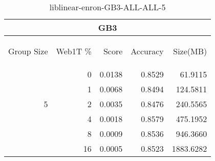 \begin{center}
\begin{table}[htbp]
\begin{tabular}{ | r | r | r | r | r |}
\hline
\multicolumn{5}{|c|}{GB3}\\
\hline
\begin{sideways}Group Size\end{sideways} & \begin{sideways}Web1T \%\end{sideways} & \begin{sideways}Score\end{sideways} & \begin{sideways}Accuracy\end{sideways} & \begin{sideways}Size(MB)\end{sideways}\\
\hline
\multirow{5}{*}{5}
 & 0 & 0.0138 & 0.8529 & 61.9115\\ \cline{2-5}
 & 1 & 0.0068 & 0.8494 & 124.5811\\ \cline{2-5}
 & 2 & 0.0035 & 0.8476 & 240.5565\\ \cline{2-5}
 & 4 & 0.0018 & 0.8579 & 475.1952\\ \cline{2-5}
 & 8 & 0.0009 & 0.8536 & 946.3660\\ \cline{2-5}
 & 16 & 0.0005 & 0.8523 & 1883.6282\\ \cline{2-5}
\hline
\end{tabular}
\caption{liblinear-enron-GB3-ALL-ALL-5}
\label{table:liblinear-enron-GB3-ALL-ALL-5}
\end{table}
\end{center}

